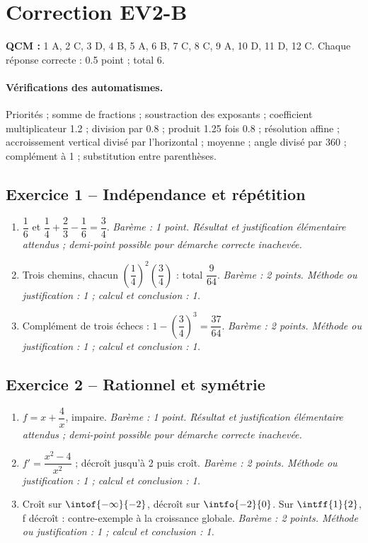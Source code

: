 \mxnewpage\section*{Correction EV2-B}\label{EV2-B-CORR}
\textbf{QCM :} 1 A, 2 C, 3 D, 4 B, 5 A, 6 B, 7 C, 8 C, 9 A, 10 D, 11 D, 12 C. Chaque réponse correcte : \num{0,5} point ; total 6.
\paragraph{Vérifications des automatismes.} Priorités ; somme de fractions ; soustraction des exposants ; coefficient multiplicateur \num{1,2} ; division par \num{0,8} ; produit \num{1,25} fois \num{0,8} ; résolution affine ; accroissement vertical divisé par l’horizontal ; moyenne ; angle divisé par 360 ; complément à 1 ; substitution entre parenthèses.
\subsection*{Exercice 1 -- Indépendance et répétition}
\begin{enumerate}
\item $\dfrac{1}{6}$ et $\dfrac{1}{4}+\dfrac{2}{3}-\dfrac{1}{6}=\dfrac{3}{4}$. \textit{Barème : 1 point. Résultat et justification élémentaire attendus ; demi-point possible pour démarche correcte inachevée.}
\item Trois chemins, chacun $(\dfrac{1}{4})^2(\dfrac{3}{4})$ : total $\dfrac{9}{64}$. \textit{Barème : 2 points. Méthode ou justification : 1 ; calcul et conclusion : 1.}
\item Complément de trois échecs : $1-(\dfrac{3}{4})^3=\dfrac{37}{64}$. \textit{Barème : 2 points. Méthode ou justification : 1 ; calcul et conclusion : 1.}
\end{enumerate}
\subsection*{Exercice 2 -- Rationnel et symétrie}
\begin{enumerate}
\item $f=x+\dfrac{4}{x}$, impaire. \textit{Barème : 1 point. Résultat et justification élémentaire attendus ; demi-point possible pour démarche correcte inachevée.}
\item $f\prime =\dfrac{x^2-4}{x^2}$ ; décroît jusqu’à 2 puis croît. \textit{Barème : 2 points. Méthode ou justification : 1 ; calcul et conclusion : 1.}
\item Croît sur $\intof{-\infty}{-2}$, décroît sur $\intfo{-2}{0}$. Sur $\intff{1}{2}$, f décroît : contre-exemple à la croissance globale. \textit{Barème : 2 points. Méthode ou justification : 1 ; calcul et conclusion : 1.}
\end{enumerate}
